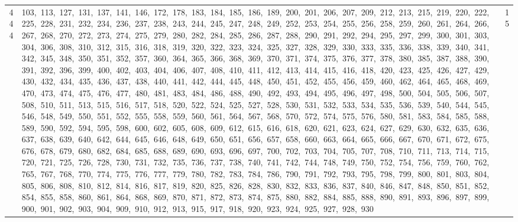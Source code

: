 \begin{longtable}{c|p{}|r}
444 & 103,\ 113,\ 127,\ 131,\ 137,\ 141,\ 146,\ 172,\ 178,\ 183,\ 184,\ 185,\ 186,\ 189,\ 200,\ 201,\ 206,\ 207,\ 209,\ 212,\ 213,\ 215,\ 219,\ 220,\ 222,\ 225,\ 228,\ 231,\ 232,\ 234,\ 236,\ 237,\ 238,\ 243,\ 244,\ 245,\ 247,\ 248,\ 249,\ 252,\ 253,\ 254,\ 255,\ 256,\ 258,\ 259,\ 260,\ 261,\ 264,\ 266,\ 267,\ 268,\ 270,\ 272,\ 273,\ 274,\ 275,\ 279,\ 280,\ 282,\ 284,\ 285,\ 286,\ 287,\ 288,\ 290,\ 291,\ 292,\ 294,\ 295,\ 297,\ 299,\ 300,\ 301,\ 303,\ 304,\ 306,\ 308,\ 310,\ 312,\ 315,\ 316,\ 318,\ 319,\ 320,\ 322,\ 323,\ 324,\ 325,\ 327,\ 328,\ 329,\ 330,\ 333,\ 335,\ 336,\ 338,\ 339,\ 340,\ 341,\ 342,\ 345,\ 348,\ 350,\ 351,\ 352,\ 357,\ 360,\ 364,\ 365,\ 366,\ 368,\ 369,\ 370,\ 371,\ 374,\ 375,\ 376,\ 377,\ 378,\ 380,\ 385,\ 387,\ 388,\ 390,\ 391,\ 392,\ 396,\ 399,\ 400,\ 402,\ 403,\ 404,\ 406,\ 407,\ 408,\ 410,\ 411,\ 412,\ 413,\ 414,\ 415,\ 416,\ 418,\ 420,\ 423,\ 425,\ 426,\ 427,\ 429,\ 430,\ 432,\ 434,\ 435,\ 436,\ 437,\ 438,\ 440,\ 441,\ 442,\ 444,\ 445,\ 448,\ 450,\ 451,\ 452,\ 455,\ 456,\ 459,\ 460,\ 462,\ 464,\ 465,\ 468,\ 469,\ 470,\ 473,\ 474,\ 475,\ 476,\ 477,\ 480,\ 481,\ 483,\ 484,\ 486,\ 488,\ 490,\ 492,\ 493,\ 494,\ 495,\ 496,\ 497,\ 498,\ 500,\ 504,\ 505,\ 506,\ 507,\ 508,\ 510,\ 511,\ 513,\ 515,\ 516,\ 517,\ 518,\ 520,\ 522,\ 524,\ 525,\ 527,\ 528,\ 530,\ 531,\ 532,\ 533,\ 534,\ 535,\ 536,\ 539,\ 540,\ 544,\ 545,\ 546,\ 548,\ 549,\ 550,\ 551,\ 552,\ 555,\ 558,\ 559,\ 560,\ 561,\ 564,\ 567,\ 568,\ 570,\ 572,\ 574,\ 575,\ 576,\ 580,\ 581,\ 583,\ 584,\ 585,\ 588,\ 589,\ 590,\ 592,\ 594,\ 595,\ 598,\ 600,\ 602,\ 605,\ 608,\ 609,\ 612,\ 615,\ 616,\ 618,\ 620,\ 621,\ 623,\ 624,\ 627,\ 629,\ 630,\ 632,\ 635,\ 636,\ 637,\ 638,\ 639,\ 640,\ 642,\ 644,\ 645,\ 646,\ 648,\ 649,\ 650,\ 651,\ 656,\ 657,\ 658,\ 660,\ 663,\ 664,\ 665,\ 666,\ 667,\ 670,\ 671,\ 672,\ 675,\ 676,\ 678,\ 679,\ 680,\ 682,\ 684,\ 685,\ 688,\ 689,\ 690,\ 693,\ 696,\ 697,\ 700,\ 702,\ 703,\ 704,\ 705,\ 707,\ 708,\ 710,\ 711,\ 713,\ 714,\ 715,\ 720,\ 721,\ 725,\ 726,\ 728,\ 730,\ 731,\ 732,\ 735,\ 736,\ 737,\ 738,\ 740,\ 741,\ 742,\ 744,\ 748,\ 749,\ 750,\ 752,\ 754,\ 756,\ 759,\ 760,\ 762,\ 765,\ 767,\ 768,\ 770,\ 774,\ 775,\ 776,\ 777,\ 779,\ 780,\ 782,\ 783,\ 784,\ 786,\ 790,\ 791,\ 792,\ 793,\ 795,\ 798,\ 799,\ 800,\ 801,\ 803,\ 804,\ 805,\ 806,\ 808,\ 810,\ 812,\ 814,\ 816,\ 817,\ 819,\ 820,\ 825,\ 826,\ 828,\ 830,\ 832,\ 833,\ 836,\ 837,\ 840,\ 846,\ 847,\ 848,\ 850,\ 851,\ 852,\ 854,\ 855,\ 858,\ 860,\ 861,\ 864,\ 868,\ 869,\ 870,\ 871,\ 872,\ 873,\ 874,\ 875,\ 880,\ 882,\ 884,\ 885,\ 888,\ 890,\ 891,\ 893,\ 896,\ 897,\ 899,\ 900,\ 901,\ 902,\ 903,\ 904,\ 909,\ 910,\ 912,\ 913,\ 915,\ 917,\ 918,\ 920,\ 923,\ 924,\ 925,\ 927,\ 928,\ 930 & 15 \\

\end{longtable}
